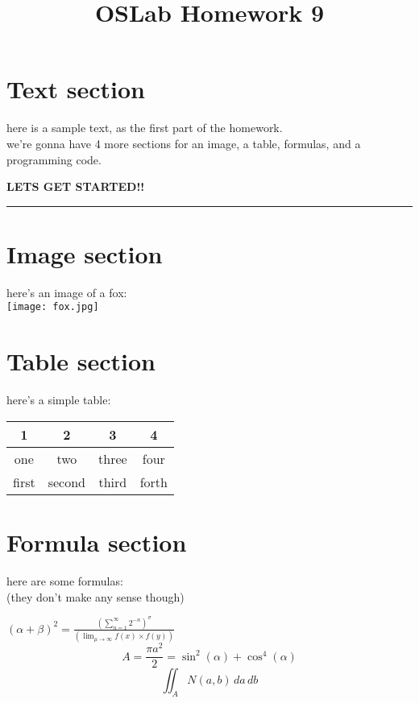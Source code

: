 \documentclass[12pt]{article}
\begin{document}
\title{OSLab Homework 9}
\maketitle

\section{Text section}
here is a sample text, as the first part of the homework.\\
we're gonna have 4 more sections for an image, a table, formulas, and a programming code.\\
\begin{center}
   \textbf{{\large LETS GET STARTED!!}} 
\end{center}

\noindent
{\color{red} \rule{\linewidth}{0.5mm} }

\section{Image section}
\begin{center}
    here's an image of a fox:\\
    \texttt{[image: fox.jpg]}
\end{center}

\section{Table section}
\begin{table}[h]
    \begin{center}
         here's a simple table: \\
        \begin{tabular}{||c|c|c|c||}
            \hline
            1 & 2 & 3 & 4\\
            \hline
            one & two & three & four\\
            \hline
            first & second & third & forth\\
            \hline
        \end{tabular}
    \end{center}
\end{table}
\section{Formula section}
    here are some formulas:\\
    (they don't make any sense though)\\
\begin{center}
    {\Large
        $(\alpha+\beta)^{2} = \frac{(\sum_{n=1}^{\infty} 2^{-n})^\sigma} {(\lim_{\mu\to\infty} f(x)\times f(y))}$
       $$ A = \frac{\pi a^2}{2} = \sin^2(\alpha)+\cos^4(\alpha) $$
       $$ \iint_A N(a,b) \, da \, db $$
    } 
\end{center}
\end{document}
